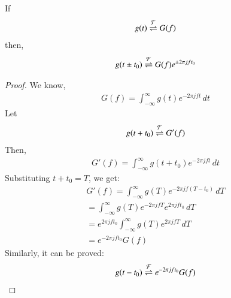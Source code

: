\documentclass[journal,12pt,twocolumn]{IEEEtran}
\begin{document}
\begin{lemma}
If 
\begin{align}
    g(t) \overset{\mathcal{F}}{ \rightleftharpoons} G(f)
\end{align}
then,
\begin{align}
    g(t \pm t_0) \overset{\mathcal{F}}{ \rightleftharpoons} G(f)e^{\pm 2\pi j f t_0}
\end{align}
\label{shift}
\end{lemma} 

\begin{proof}
We know, 
\begin{align}
    G(f) = \int_{-\infty}^\infty g(t) e^{-2\pi j ft} \,dt
\end{align}
Let 
\begin{align}
    g(t + t_0) \overset{\mathcal{F}}{ \rightleftharpoons} G'(f)
\end{align}
Then,
\begin{align}
    G'(f) = \int_{-\infty}^\infty g(t + t_0) e^{-2\pi j ft} \,dt
\end{align}
Substituting $t + t_0 = T$, we get:
\begin{align}
    G'(f) = \int_{-\infty}^\infty g(T) e^{-2\pi j f(T - t_0)} \,dT\\
     = \int_{-\infty}^\infty g(T) e^{-2\pi j fT} e^{2\pi j ft_0} \,dT\\
      =e^{2\pi j ft_0} \int_{-\infty}^\infty g(T) e^{2\pi j fT} \,dT\\
       = e^{-2\pi j ft_0}G(f)
\end{align}
Similarly, it can be proved:
 \begin{align}
     g(t - t_0) \overset{\mathcal{F}}{ \rightleftharpoons} e^{-2\pi j ft_0}G(f)
 \end{align}
\end{proof}
\end{document}
